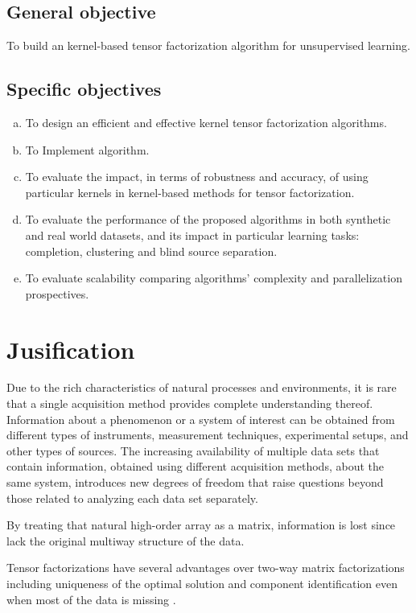 \documentclass[letterpaper,12pt]{article}
\begin{document}
\subsection*{General objective}

To build an kernel-based tensor factorization algorithm for unsupervised learning.
% 
% 
% 
\subsection*{Specific objectives}

\begin{enumerate}[(a)]
 \item To design an efficient and effective kernel tensor factorization algorithms.
 \item To Implement algorithm.
 \item To evaluate the impact, in terms of robustness and accuracy, of using particular kernels in kernel-based methods for tensor factorization. 
 \item To evaluate the performance of the proposed algorithms in both synthetic and real world datasets, and its impact in particular learning tasks: completion, clustering and blind source separation.
 \item To evaluate scalability comparing algorithms’ complexity and parallelization prospectives.
\end{enumerate}


\section{Jusification}



Due to the rich characteristics of natural processes and environments, it is rare that a single acquisition method provides complete understanding thereof. Information about a phenomenon or a system of interest can be obtained from different types of instruments, measurement techniques, experimental setups, and other types of sources. The increasing availability of multiple data sets that contain information, obtained using different acquisition methods, about the same system, introduces new degrees of freedom that raise questions beyond those related to analyzing each data set separately.

By treating that natural high-order array as a matrix, information is lost since lack the original multiway structure of the data.


Tensor factorizations have several advantages over two-way matrix factorizations including uniqueness of the optimal solution and component identification even when most of the data is missing \cite{Morup2011}. 
\end{document}
